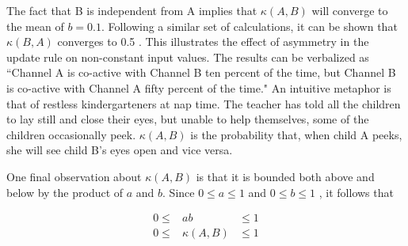 The fact that B is independent from A implies that $\kappa(A, B)$ will converge to the mean of $b=0.1$. Following a similar set of calculations, it can be shown that $\kappa(B, A)$ converges to 0.5 . This illustrates the effect of asymmetry in the update rule on non-constant input values. The results can be verbalized as ``Channel A is co-active with Channel B ten percent of the time, but Channel B is co-active with Channel A fifty percent of the time." An intuitive metaphor is that of restless kindergarteners at nap time. The teacher has told all the children to lay still and close their eyes, but unable to help themselves, some of the children occasionally peek. $\kappa(A, B)$ is the probability that, when child A peeks, she will see child B's eyes open and vice versa.

One final observation about $\kappa(A, B)$ is that it is bounded both above and below by the product of $a$ and $b$. Since $0 \leq a \leq 1$ and $0 \leq b \leq 1$ ,  it follows that 

\begin{eqnarray}
0 \leq&ab&  \leq 1 \\
0 \leq&\kappa(A, B)&  \leq 1 
\end{eqnarray}
